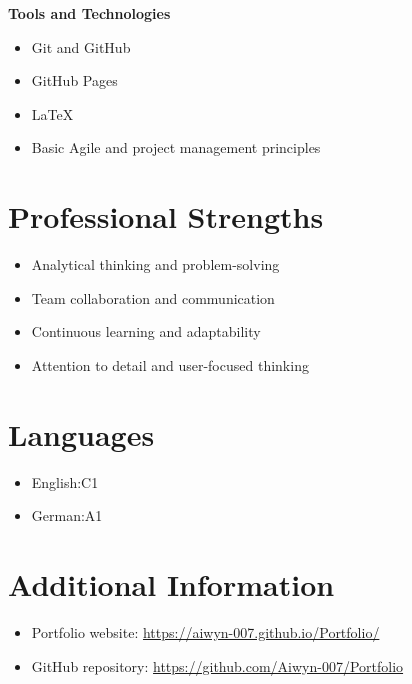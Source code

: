 \documentclass[11pt,a4paper]{article}
\begin{document}
\textbf{Tools and Technologies}
\begin{itemize}
    \item Git and GitHub
    \item GitHub Pages
    \item LaTeX
    \item Basic Agile and project management principles
\end{itemize}

\section*{Professional Strengths}

\begin{itemize}
    \item Analytical thinking and problem-solving
    \item Team collaboration and communication
    \item Continuous learning and adaptability
    \item Attention to detail and user-focused thinking
\end{itemize}

\section*{Languages}

\begin{itemize}
    \item English:C1
    \item German:A1
\end{itemize}

\section*{Additional Information}

\begin{itemize}
    \item Portfolio website:
    \href{https://YOUR-GITHUB-USERNAME.github.io/YOUR-REPOSITORY-NAME/}
    {https://aiwyn-007.github.io/Portfolio/}
    \item GitHub repository:
    \href{https://github.com/YOUR-GITHUB-USERNAME/YOUR-REPOSITORY-NAME}
    {https://github.com/Aiwyn-007/Portfolio}
\end{itemize}
\end{document}
